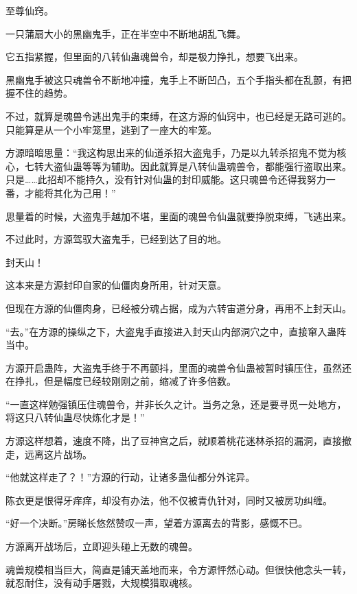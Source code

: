 
\begin{this_body}



至尊仙窍。

一只蒲扇大小的黑幽鬼手，正在半空中不断地胡乱飞舞。

它五指紧握，但里面的八转仙蛊魂兽令，却是极力挣扎，想要飞出来。

黑幽鬼手被这只魂兽令不断地冲撞，鬼手上不断凹凸，五个手指头都在乱颤，有把握不住的趋势。

不过，就算是魂兽令逃出鬼手的束缚，在这方源的仙窍中，也已经是无路可逃的。只能算是从一个小牢笼里，逃到了一座大的牢笼。

方源暗暗思量：“我这构思出来的仙道杀招大盗鬼手，乃是以九转杀招鬼不觉为核心，七转大盗仙蛊等等为辅助。因此就算是八转仙蛊魂兽令，都能强行盗取出来。只是……此招却不能持久，没有针对仙蛊的封印威能。这只魂兽令还得我努力一番，才能将其化为己用！”

思量着的时候，大盗鬼手越加不堪，里面的魂兽令仙蛊就要挣脱束缚，飞逃出来。

不过此时，方源驾驭大盗鬼手，已经到达了目的地。

封天山！

这本来是方源封印自家的仙僵肉身所用，针对天意。

但现在方源的仙僵肉身，已经被分魂占据，成为六转宙道分身，再用不上封天山。

“去。”在方源的操纵之下，大盗鬼手直接进入封天山内部洞穴之中，直接窜入蛊阵当中。

方源开启蛊阵，大盗鬼手终于不再颤抖，里面的魂兽令仙蛊被暂时镇压住，虽然还在挣扎，但是幅度已经较刚刚之前，缩减了许多倍数。

“一直这样勉强镇压住魂兽令，并非长久之计。当务之急，还是要寻觅一处地方，将这只八转仙蛊尽快炼化才是！”

方源这样想着，速度不降，出了豆神宫之后，就顺着桃花迷林杀招的漏洞，直接撤走，远离这片战场。

“他就这样走了？！”方源的行动，让诸多蛊仙都分外诧异。

陈衣更是恨得牙痒痒，却没有办法，他不仅被青仇针对，同时又被房功纠缠。

“好一个决断。”房睇长悠然赞叹一声，望着方源离去的背影，感慨不已。

方源离开战场后，立即迎头碰上无数的魂兽。

魂兽规模相当巨大，简直是铺天盖地而来，令方源怦然心动。但很快他念头一转，就忍耐住，没有动手屠戮，大规模猎取魂核。


\end{this_body}
